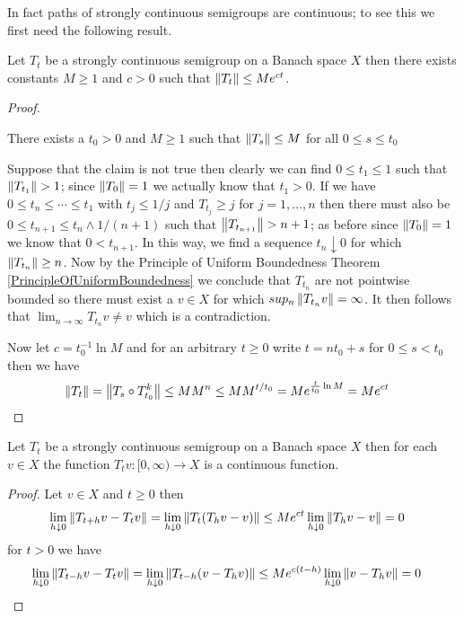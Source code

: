 In fact paths of strongly continuous semigroups are continuous; to see this we first need the following result.
\begin{lem}\label{StronglyContinuousSemigroupNormBound}Let $T_t$ be a strongly continuous semigroup on a Banach space $X$ then there exists constants $M \geq 1$ and $c > 0$ such that 
$\left \lVert T_t \right \rVert \leq M e^{ct}$.
\end{lem}
\begin{proof}
\begin{clm}There exists a $t_0 > 0$ and $M \geq 1$ such that $\left \lVert T_s \right \rVert \leq M$ for all $0 \leq s \leq t_0$
\end{clm}
Suppose that the claim is not true then clearly we can find $0 \leq t_1 \leq 1$ such that $\left \lVert T_{t_1} \right \rVert > 1$; since $\left \lVert T_0 \right \rVert = 1$ we actually know that $t_1 > 0$.  If we have $0 \leq t_n \leq \dotsb \leq t_1$ with $t_j \leq 1/j$ and $T_{t_j} \geq j$ for $j=1, \dotsc, n$ then there must also be $0 \leq t_{n+1} \leq t_{n} \wedge 1/(n+1)$ such that $\left \lVert T_{t_{n+1}} \right \rVert > n+1$; as before since $\left \lVert T_0 \right \rVert = 1$ we know that $0 < t_{n+1}$.  In this way,  we find a sequence $t_n \downarrow 0$ for which $\left \lVert T_{t_n} \right \rVert \geq n$.  Now by the Principle of Uniform Boundedness Theorem \ref{PrincipleOfUniformBoundedness} we conclude that $T_{t_n}$ are not pointwise bounded so there must exist a $v \in X$ for which $sup_n \left \lVert T_{t_n} v \right \rVert = \infty$.  It then follows that $\lim_{n \to \infty} T_{t_n} v \neq v$ which is a contradiction.

Now let $c = t_0^{-1} \ln M$ and for an arbitrary $t \geq 0$ write $t = n t_0 + s$ for $0 \leq s < t_0$ then we have
\begin{align*}
\left \lVert T_t \right \rVert &= \left \lVert T_s \circ T_{t_0}^k \right \rVert \leq M M^{n} \leq M M^{t/t_0} = M e^{\frac{t}{t_0} \ln M} = M e^{ct}
\end{align*}
\end{proof}

\begin{prop}\label{StronglyContinuousSemigroupContinuousPaths}Let $T_t$ be a strongly continuous semigroup on a Banach space $X$ then for each $v \in X$ the function $T_t v : [0,\infty) \to X$ is a continuous function.
\end{prop}
\begin{proof}
Let $v \in X$ and $t \geq 0$ then 
\begin{align*}
\lim_{h \downarrow 0} \left \lVert T_{t+h} v - T_t v \right \rVert &= \lim_{h \downarrow 0} \left \lVert T_{t}(T_hv - v) \right \rVert \leq M e^{ct} \lim_{h \downarrow 0}\left \lVert T_h v - v \right \rVert = 0
\end{align*}
for $t > 0$ we have
\begin{align*}
\lim_{h \downarrow 0} \left \lVert T_{t-h} v - T_t v \right \rVert &= \lim_{h \downarrow 0} \left \lVert T_{t-h}(v - T_hv) \right \rVert \leq M e^{c(t-h)} \lim_{h \downarrow 0}\left \lVert v - T_h v \right \rVert = 0
\end{align*}
\end{proof}

